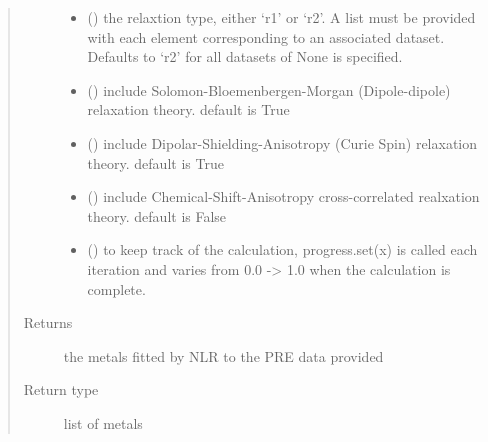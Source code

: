 \documentclass[a4paper,10pt,english]{sphinxmanual}
\begin{document}
\begin{fulllineitems}
\begin{quote}
\begin{description}
\begin{itemize}
\item {} 
 (\sphinxstyleliteralemphasis{\sphinxupquote{, }}) \textendash{} the relaxtion type, either ‘r1’ or ‘r2’. A list must be provided with
each element corresponding to an associated dataset.
Defaults to ‘r2’ for all datasets of None is specified.

\item {} 
 (\sphinxstyleliteralemphasis{\sphinxupquote{, }}) \textendash{} include Solomon-Bloemenbergen-Morgan (Dipole-dipole) relaxation theory.
default is True

\item {} 
 (\sphinxstyleliteralemphasis{\sphinxupquote{, }}) \textendash{} include Dipolar-Shielding-Anisotropy (Curie Spin) relaxation theory.
default is True

\item {} 
 (\sphinxstyleliteralemphasis{\sphinxupquote{, }}) \textendash{} include Chemical-Shift-Anisotropy cross-correlated realxation theory.
default is False

\item {} 
 (\sphinxstyleliteralemphasis{\sphinxupquote{, }}) \textendash{} to keep track of the calculation, progress.set(x) is called each
iteration and varies from 0.0 -\textgreater{} 1.0 when the calculation is complete.

\end{itemize}

\item[{Returns}] \leavevmode
{} \textendash{} the metals fitted by NLR to the PRE data provided

\item[{Return type}] \leavevmode
list of metals

\end{description}\end{quote}

\end{fulllineitems}
\end{document}

